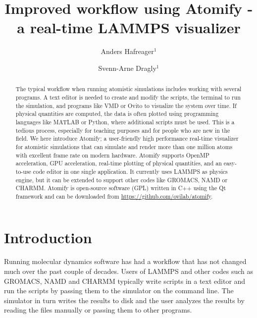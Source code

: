 \documentclass[12pt,a4paper,final]{iopart}
\begin{document}
\title{Improved workflow using Atomify - a real-time LAMMPS visualizer}

\author[cor1]{Anders Hafreager$^{1}$}

\author{Svenn-Arne Dragly$^{1}$}
\address{$^1$Department of Physics - University of Oslo\\Sem S{\ae}lands vei 24, NO-0316, Oslo, Norway}

\begin{abstract}
The typical workflow when running atomistic simulations includes working with several programs.
A text editor is needed to create and modify the scripts, the terminal to run the simulation, and programs like VMD or Ovito to visualize the system over time.
If physical quantities are computed, the data is often plotted using programming languages like MATLAB or Python,
where additional scripts must be used.
This is a tedious process, especially for teaching purposes and for people who are new in the field.
We here introduce Atomify; a user-friendly high performance real-time visualizer for atomistic simulations that can simulate and render more than one million atoms with excellent frame rate on modern hardware.
Atomify supports OpenMP acceleration, GPU acceleration, real-time plotting of physical quantities, and an easy-to-use code editor in one single application.
It currently uses LAMMPS as physics engine, but it can be extended to support other codes like GROMACS, NAMD or CHARMM.
Atomify is open-source software (GPL) written in C++ using the Qt framework and can be downloaded from \url{https://github.com/ovilab/atomify}.
\end{abstract}

\vspace{2pc}

\section{Introduction}
Running molecular dynamics software has had a workflow that has not changed much over the past couple of decades.
Users of LAMMPS\cite{Plimpton1995Fast} and other codes such
as GROMACS\cite{berendsen1995gromacs}, NAMD\cite{nelson1996namd} and CHARMM\cite{brooks2009charmm} typically write
scripts in a text editor and run the scripts by passing them to the simulator on the command line.
The simulator in turn writes the results to disk and the user analyzes the results
by reading the files manually or passing them to other programs.
\end{document}
